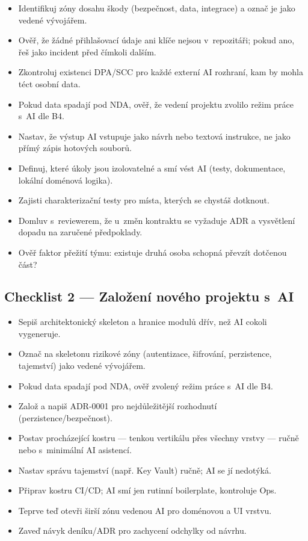 \begin{itemize}[label={}]
\item \cb Identifikuj zóny dosahu škody (bezpečnost, data, integrace) a označ je jako vedené vývojářem.
\item \cb Ověř, že žádné přihlašovací údaje ani klíče nejsou v~repozitáři; pokud ano, řeš jako incident před čímkoli dalším.
\item \cb Zkontroluj existenci DPA/SCC pro každé externí AI rozhraní, kam by mohla téct osobní data.
\item \cb Pokud data spadají pod NDA, ověř, že vedení projektu zvolilo režim práce s~AI dle B4.
\item \cb Nastav, že výstup AI vstupuje jako návrh nebo textová instrukce, ne jako přímý zápis hotových souborů.
\item \cb Definuj, které úkoly jsou izolovatelné a smí vést AI (testy, dokumentace, lokální doménová logika).
\item \cb Zajisti charakterizační testy pro místa, kterých se chystáš dotknout.
\item \cb Domluv s~reviewerem, že u~změn kontraktu se vyžaduje ADR a vysvětlení dopadu na zaručené předpoklady.
\item \cb Ověř faktor přežití týmu: existuje druhá osoba schopná převzít dotčenou část?
\end{itemize}

\subsection{Checklist 2 --- Založení nového projektu s~AI}

\begin{itemize}[label={}]
\item \cb Sepiš architektonický skeleton a hranice modulů dřív, než AI cokoli vygeneruje.
\item \cb Označ na skeletonu rizikové zóny (autentizace, šifrování, perzistence, tajemství) jako vedené vývojářem.
\item \cb Pokud data spadají pod NDA, ověř zvolený režim práce s~AI dle B4.
\item \cb Založ  a napiš ADR-0001 pro nejdůležitější rozhodnutí (perzistence/bezpečnost).
\item \cb Postav procházející kostru --- tenkou vertikálu přes všechny vrstvy --- ručně nebo s~minimální AI asistencí.
\item \cb Nastav správu tajemství (např. Key Vault) ručně; AI se jí nedotýká.
\item \cb Připrav kostru CI/CD; AI smí jen rutinní boilerplate, kontroluje Ops.
\item \cb Teprve teď otevři širší zónu vedenou AI pro doménovou a UI vrstvu.
\item \cb Zaveď návyk deníku/ADR pro zachycení odchylky od návrhu.
\end{itemize}

